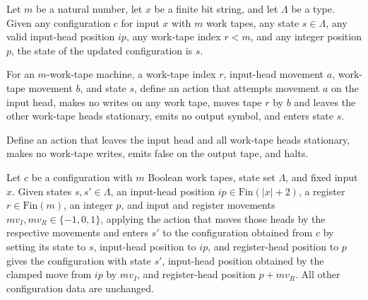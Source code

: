 \begin{lemma}
\label{Complexity.LogProg.xCfg_state}
\leanok
{}
Let $m$ be a natural number, let $x$ be a finite bit string, and let $\Lambda$ be a
type. Given any configuration $c$ for input $x$ with $m$ work tapes, any state
$s\in\Lambda$, any valid input-head position $ip$, any work-tape index $r<m$, and any
integer position $p$, the state of the updated configuration is $s$.
\end{lemma}

\begin{definition}
\label{Complexity.LogProg.xAct}
\leanok
{}
For an $m$-work-tape machine, a work-tape index $r$, input-head movement $a$, work-tape
movement $b$, and state $s$, define an action that attempts movement $a$ on the input
head, makes no writes on any work tape, moves tape $r$ by $b$ and leaves the other
work-tape heads stationary, emits no output symbol, and enters state $s$.
\end{definition}

\begin{definition}
\label{Complexity.LogProg.rejAct}
\leanok
{}
Define an action that leaves the input head and all work-tape heads stationary, makes no
work-tape writes, emits false on the output tape, and halts.
\end{definition}

\begin{lemma}
\label{Complexity.LogProg.apply_xAct}
\leanok
{}
Let $c$ be a configuration with $m$ Boolean work tapes, state set $\Lambda$, and fixed
input $x$. Given states $s,s'\in\Lambda$, an input-head position
$ip\in\mathrm{Fin}(|x|+2)$, a register $r\in\mathrm{Fin}(m)$, an integer $p$, and input
and register movements $mv_I,mv_R\in\{-1,0,1\}$, applying the action that moves those
heads by the respective movements and enters $s'$ to the configuration obtained from $c$
by setting its state to $s$, input-head position to $ip$, and register-head position to
$p$ gives the configuration with state $s'$, input-head position obtained by the clamped
move from $ip$ by $mv_I$, and register-head position $p+mv_R$. All other configuration
data are unchanged.
\end{lemma}

